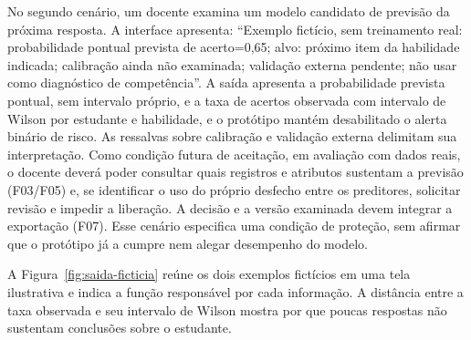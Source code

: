 No segundo cenário, um docente examina um modelo candidato de previsão da próxima resposta. A interface apresenta: ``Exemplo fictício, sem treinamento real: probabilidade pontual prevista de acerto=0,65; alvo: próximo item da habilidade indicada; calibração ainda não examinada; validação externa pendente; não usar como diagnóstico de competência''. A saída apresenta a probabilidade prevista pontual, sem intervalo próprio, e a taxa de acertos observada com intervalo de Wilson por estudante e habilidade, e o protótipo mantém desabilitado o alerta binário de risco. As ressalvas sobre calibração e validação externa delimitam sua interpretação. Como condição futura de aceitação, em avaliação com dados reais, o docente deverá poder consultar quais registros e atributos sustentam a previsão (F03/F05) e, se identificar o uso do próprio desfecho entre os preditores, solicitar revisão e impedir a liberação. A decisão e a versão examinada devem integrar a exportação (F07). Esse cenário especifica uma condição de proteção, sem afirmar que o protótipo já a cumpre nem alegar desempenho do modelo.

A Figura~\ref{fig:saida-ficticia} reúne os dois exemplos fictícios em uma tela ilustrativa e indica a função responsável por cada informação. A distância entre a taxa observada e seu intervalo de Wilson mostra por que poucas respostas não sustentam conclusões sobre o estudante.


